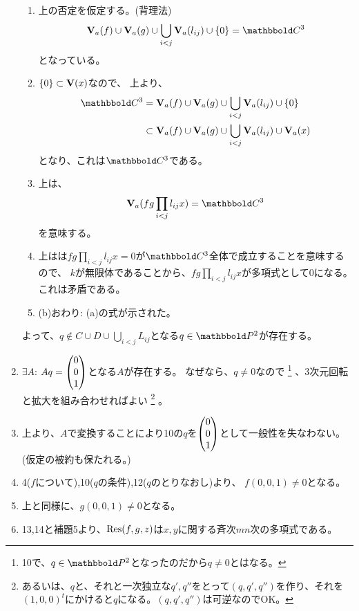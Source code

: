 \begin{myproof}
\begin{enumerate}
\begin{enumerate}
      \item
      上の否定を仮定する。(背理法)
      \begin{align}
        \var_a(f) \cup \var_a(g) \cup \bigcup_{i<j}\var_a(l_{ij}) \cup \zeroset = \C^3
      \end{align}
      となっている。
      \item
      $\{0\} \subset \textbf V(x)$なので、
      上より、
      \begin{align}
        \C^3
        &=
        \var_a(f) \cup \var_a(g) \cup \bigcup_{i<j}\var_a(l_{ij}) \cup \zeroset \\
        &\subset
        \var_a(f) \cup \var_a(g) \cup \bigcup_{i<j}\var_a(l_{ij}) \cup \var_a(x)
      \end{align}
      となり、これは$\C^3$である。
      \item
      上は、
      \begin{align}
        \var_a(fg \prod_{i<j}l_{ij} x) = \C^3
      \end{align}
      を意味する。
      \item
      上はは$fg \prod_{i<j}l_{ij}x = 0$が$\C^3$全体で成立することを意味するので、
      $k$が無限体であることから、$fg \prod_{i<j}l_{ij}x$が多項式として0になる。これは矛盾である。
      \item
      (b)おわり: (a)の式が示された。
    \end{enumerate}
    よって、$q \notin C\cup D \cup \bigcup_{i<j}L_{ij}$となる$q\in \P^2$が存在する。
    \item $\exists A$:
    $Aq = \left(\begin{matrix} 0 \\ 0 \\ 1 \end{matrix}\right)$となる$A$が存在する。
    なぜなら、$q\neq 0$なので
    \footnote{10で、$q\in \P^2$となったのだから$q\neq 0$とはなる。}
    、3次元回転と拡大を組み合わせればよい
    \footnote{あるいは、$q$と、それと一次独立な$q',q''$をとって$(q,q',q'')$を作り、それを$(1,0,0)^t$にかけると$q$になる。$(q,q',q'')$は可逆なのでOK。}
    。
    \item
    上より、$A$で変換することにより10の$q$を$\left(\begin{matrix} 0 \\ 0\\ 1 \end{matrix}\right)$として一般性を失なわない。
    (仮定の被約も保たれる。)
    \item
    4($f$について),10($q$の条件),12($q$のとりなおし)より、
    $f(0,0,1)\neq 0$となる。
    \item
    上と同様に、$g(0,0,1)\neq 0$となる。
    \item
    13,14と補題5より、$\mathrm{Res}(f,g,z)$は$x,y$に関する斉次$mn$次の多項式である。

\end{enumerate}
\end{myproof}
